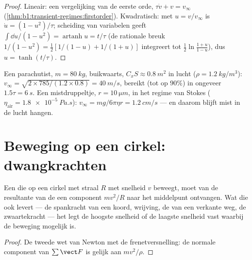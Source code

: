 \begin{proof}
Lineair: een vergelijking van de eerste orde, $\tau\dot v + v = v_\infty$
(\cref{thm:b1:transient-regimes:firstorder}). Kwadratisch: met
$u = v/v_\infty$ is $\dot u = (1 - u^2)/\tau$; scheiding van variabelen geeft
$\int\dd u/(1 - u^2) = \operatorname{artanh}u = t/\tau$ (de rationale
breuk $1/(1 - u^2) = \tfrac12[1/(1 - u) + 1/(1 + u)]$ integreert tot
$\tfrac12\ln\frac{1 + u}{1 - u}$), dus $u = \tanh(t/\tau)$.
\end{proof}

\begin{example}\label{ex:b1:newton-dynamics:terminal}
Een parachutist, $m = \qty{80}{kg}$, buikwaarts, $C_xS \approx \qty{0.8}{m^2}$
in lucht ($\rho = \qty{1.2}{kg/m^3}$): $v_\infty = \sqrt{2 \times 785/(1.2
\times 0.8)} = \qty{40}{m/s}$, bereikt (tot op $90\%$) in ongeveer $1.5\tau =
\qty{6}{s}$. Een mistdruppeltje, $r = \qty{10}{\micro m}$, in het regime van Stokes
($\eta_{\text{air}} = \qty{1.8e-5}{Pa.s}$): $v_\infty = mg/6\pi\eta r =
\qty{1.2}{cm/s}$ --- en daarom blijft mist in de lucht hangen.
\end{example}

\section{Beweging op een cirkel: dwangkrachten}

\begin{proposition}\label{prop:b1:newton-dynamics:centripetal}
Een  die op een cirkel met straal $R$ met snelheid $v$ beweegt, moet
van de resultante van de  een component $mv^2/R$ naar het
middelpunt ontvangen. Wat die ook levert --- de spankracht van een koord, wrijving, de
 van een verkante weg, de zwaartekracht --- het legt de hoogste snelheid of de
laagste snelheid vast waarbij de beweging mogelijk is.
\end{proposition}

\begin{proof}
De tweede wet van Newton met de frenetversnelling: de normale component
van $\sum\vect F$ is gelijk aan $mv^2/\rho$.
\end{proof}

